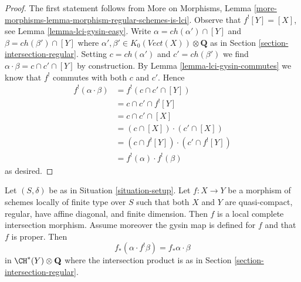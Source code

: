 \begin{proof}
The first statement follows from
More on Morphisms, Lemma
\ref{more-morphisms-lemma-morphism-regular-schemes-is-lci}.
Observe that $f^![Y] = [X]$, see Lemma \ref{lemma-lci-gysin-easy}.
Write $\alpha = ch(\alpha') \cap [Y]$ and $\beta = ch(\beta') \cap [Y]$
where $\alpha', \beta' \in K_0(\textit{Vect}(X)) \otimes \mathbf{Q}$
as in Section \ref{section-intersection-regular}.
Setting $c = ch(\alpha')$ and $c' = ch(\beta')$ we find
$\alpha \cdot \beta = c \cap c' \cap [Y]$ by construction.
By Lemma \ref{lemma-lci-gysin-commutes} we know that $f^!$
commutes with both $c$ and $c'$. Hence
\begin{align*}
f^!(\alpha \cdot \beta)
& =
f^!(c \cap c' \cap [Y]) \\
& =
c \cap c' \cap f^![Y] \\
& =
c \cap c' \cap [X] \\
& =
(c \cap [X]) \cdot (c' \cap [X]) \\
& =
(c \cap f^![Y]) \cdot (c' \cap f^![Y]) \\
& =
f^!(\alpha) \cdot f^!(\beta)
\end{align*}
as desired.
\end{proof}

\begin{lemma}
\label{lemma-projection-formula-regular}
Let $(S, \delta)$ be as in Situation \ref{situation-setup}.
Let $f : X \to Y$ be a morphism of schemes locally of finite
type over $S$ such that both $X$ and $Y$ are quasi-compact,
regular, have affine diagonal, and finite dimension.
Then $f$ is a local complete intersection morphism.
Assume moreover the gysin map is defined for $f$
and that $f$ is proper. Then
$$
f_*(\alpha \cdot f^!\beta) = f_*\alpha \cdot \beta
$$
in $\CH^*(Y) \otimes \mathbf{Q}$ where the intersection product
is as in Section \ref{section-intersection-regular}.
\end{lemma}


